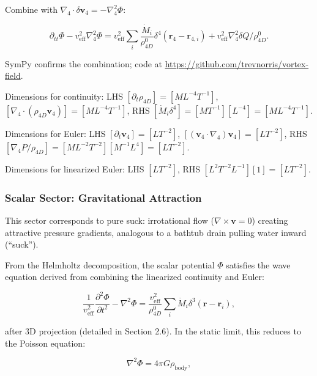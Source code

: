 Combine with $\nabla_4 \cdot \delta \mathbf{v}_4 = -\nabla_4^2 \Phi$:

\begin{equation}
\partial_{tt} \Phi - v_{\text{eff}}^2 \nabla_4^2 \Phi = v_{\text{eff}}^2 \sum_i \frac{\dot{M}_i}{\rho_{4D}^0} \delta^4(\mathbf{r}_4 - \mathbf{r}_{4,i}) + v_{\text{eff}}^2 \nabla_4^2 \delta Q / \rho_{4D}^0.
\end{equation}

SymPy confirms the combination; code at \url{https://github.com/trevnorris/vortex-field}.

\begin{tcolorbox}[title=Dimensional Checks]
Dimensions for continuity: LHS $[\partial_t \rho_{4D}] = [M L^{-4} T^{-1}]$, $[\nabla_4 \cdot (\rho_{4D} \mathbf{v}_4)] = [M L^{-4} T^{-1}]$, RHS $[\dot{M}_i \delta^4] = [M T^{-1}] [L^{-4}] = [M L^{-4} T^{-1}]$.

Dimensions for Euler: LHS $[\partial_t \mathbf{v}_4] = [L T^{-2}]$, $[(\mathbf{v}_4 \cdot \nabla_4) \mathbf{v}_4] = [L T^{-2}]$, RHS $[\nabla_4 P / \rho_{4D}] = [M L^{-2} T^{-2}] [M^{-1} L^{4}] = [L T^{-2}]$.

Dimensions for linearized Euler: LHS $[L T^{-2}]$, RHS $[L^2 T^{-2} L^{-1}] [1] = [L T^{-2}]$.
\end{tcolorbox}

\subsubsection{Scalar Sector: Gravitational Attraction}

This sector corresponds to pure suck: irrotational flow ($\nabla \times \mathbf{v} = 0$) creating attractive pressure gradients, analogous to a bathtub drain pulling water inward (``suck'').

From the Helmholtz decomposition, the scalar potential $\Phi$ satisfies the wave equation derived from combining the linearized continuity and Euler:

\begin{equation}
\frac{1}{v_{\text{eff}}^2} \frac{\partial^2 \Phi}{\partial t^2} - \nabla^2 \Phi = \frac{v_{\text{eff}}^2}{\rho_{4D}^0} \sum_i \dot{M}_i \delta^3(\mathbf{r} - \mathbf{r}_i),
\end{equation}

after 3D projection (detailed in Section 2.6). In the static limit, this reduces to the Poisson equation:

\begin{equation}
\nabla^2 \Phi = 4\pi G \rho_{\text{body}},
\end{equation}

